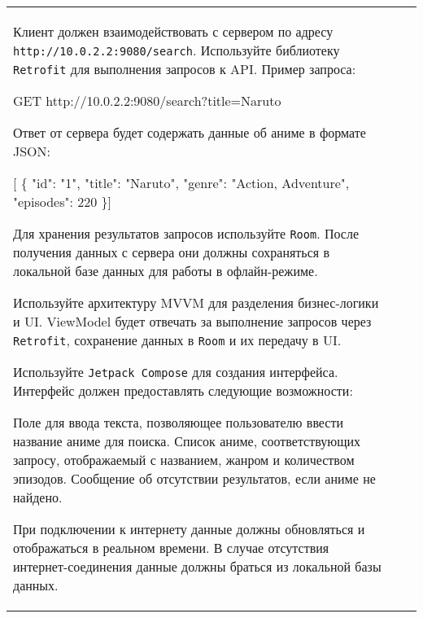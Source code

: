 \documentclass[a4paper]{article}
\begin{document}
\begin{tabular}{!{\vrule width 2pt}p{5cm}|p{6cm}|p{4cm}!{\vrule width 2pt}}
{\begin{minipage}{16cm}
\begin{enumerate}

Клиент должен взаимодействовать с сервером по адресу \texttt{http://10.0.2.2:9080/search}. Используйте библиотеку \texttt{Retrofit} для выполнения запросов к API. Пример запроса:

 GET http://10.0.2.2:9080/search?title=Naruto 

Ответ от сервера будет содержать данные об аниме в формате JSON:

 [ \{ "id": "1", "title": "Naruto", 
    "genre": "Action, Adventure", "episodes": 220 \}] 


Для хранения результатов запросов используйте \texttt{Room}. После получения данных с сервера они должны сохраняться в локальной базе данных для работы в офлайн-режиме.


Используйте архитектуру MVVM для разделения бизнес-логики и UI. ViewModel будет отвечать за выполнение запросов через \texttt{Retrofit}, сохранение данных в \texttt{Room} и их передачу в UI.


Используйте \texttt{Jetpack Compose} для создания интерфейса. Интерфейс должен предоставлять следующие возможности:

Поле для ввода текста, позволяющее пользователю ввести название аниме для поиска.
Список аниме, соответствующих запросу, отображаемый с названием, жанром и количеством эпизодов.
Сообщение об отсутствии результатов, если аниме не найдено.

При подключении к интернету данные должны обновляться и отображаться в реальном времени.
В случае отсутствия интернет-соединения данные должны браться из локальной базы данных.
\end{enumerate}


\end{minipage}}
\end{tabular}
\end{document}
